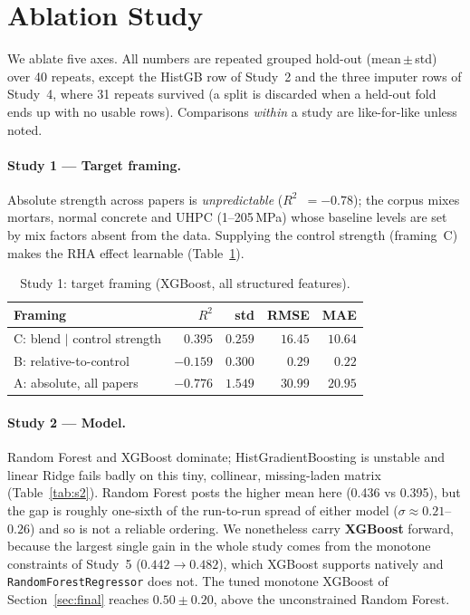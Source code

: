 \documentclass[11pt]{article}
\newcommand{\R}{$R^2$}
\begin{document}
\section{Ablation Study}
We ablate five axes. All numbers are repeated grouped hold-out (mean\,$\pm$\,std) over
40 repeats, except the HistGB row of Study~2 and the three imputer rows of Study~4,
where 31 repeats survived (a split is discarded when a held-out fold ends up with no
usable rows). Comparisons \emph{within} a study are like-for-like unless noted.

\paragraph{Study 1 --- Target framing.}
Absolute strength across papers is \emph{unpredictable} (\R{}~$=-0.78$); the corpus
mixes mortars, normal concrete and UHPC (1--205\,MPa) whose baseline levels are set by
mix factors absent from the data. Supplying the control strength (framing~C) makes the
RHA effect learnable (Table~\ref{tab:s1}).

\begin{table}[H]\centering\small
\caption{Study 1: target framing (XGBoost, all structured features).}
\label{tab:s1}
\begin{tabular}{lrrrr}
\toprule
Framing & \R{} & std & RMSE & MAE \\
\midrule
\rowcolor{green!12}C: blend $\mid$ control strength & $0.395$ & $0.259$ & $16.45$ & $10.64$ \\
B: relative-to-control & $-0.159$ & $0.300$ & $0.29$ & $0.22$ \\
A: absolute, all papers & $-0.776$ & $1.549$ & $30.99$ & $20.95$ \\
\bottomrule
\end{tabular}
\end{table}

\paragraph{Study 2 --- Model.}
Random Forest and XGBoost dominate; HistGradientBoosting is unstable and linear
Ridge fails badly on this tiny, collinear, missing-laden matrix
(Table~\ref{tab:s2}). Random Forest posts the higher mean here (0.436 vs 0.395), but
the gap is roughly one-sixth of the run-to-run spread of either model
($\sigma\approx0.21$--$0.26$) and so is not a reliable ordering. We nonetheless carry
\textbf{XGBoost} forward, because the largest single gain in the whole study comes from
the monotone constraints of Study~5 ($0.442\rightarrow0.482$), which XGBoost supports
natively and \texttt{RandomForestRegressor} does not. The tuned monotone XGBoost of
Section~\ref{sec:final} reaches $0.50\pm0.20$, above the unconstrained Random Forest.
\end{document}
